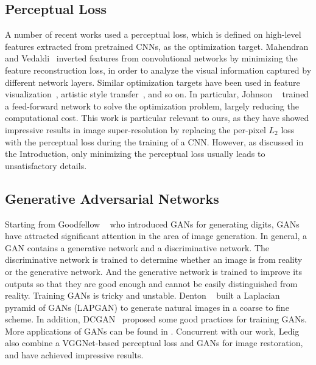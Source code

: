 \documentclass[10pt,twocolumn,letterpaper]{article}
\begin{document}
\subsection{Perceptual Loss}
A number of recent works used a perceptual loss, which is defined on high-level features extracted from pretrained CNNs, as the optimization target. Mahendran and Vedaldi~\cite{feature_inversion} inverted features from convolutional networks by minimizing the feature reconstruction loss, in order to analyze the visual information captured by different network layers. Similar optimization targets have been used in feature visualization~\cite{feature_visualization}, artistic style transfer~\cite{style_transfer,artistic_style}, and so on. In particular, Johnson \etal~\cite{perceptual_losses} trained a feed-forward network to solve the optimization problem, largely reducing the computational cost. This work is particular relevant to ours, as they have showed impressive results in image super-resolution by replacing the per-pixel $L_2$ loss with the perceptual loss during the training of a CNN. However, as discussed in the Introduction, only minimizing the perceptual loss usually leads to unsatisfactory details.

\subsection{Generative Adversarial Networks}
Starting from Goodfellow \etal~\cite{gan} who introduced GANs for generating digits, GANs have attracted significant attention in the area of image generation. In general, a GAN contains a generative network and a discriminative network. The discriminative network is trained to determine whether an image is from reality or the generative network. And the generative network is trained to improve its outputs so that they are good enough and cannot be easily distinguished from reality. Training GANs is tricky and unstable. Denton \etal~\cite{lapgan} built a Laplacian pyramid of GANs (LAPGAN) to generate natural images in a coarse to fine scheme. %
In addition, DCGAN~\cite{dcgan} proposed some good practices for training GANs. More applications of GANs can be found in \cite{deep_multi_scale,generating_images_with_recurrent,generative_image_modeling}. Concurrent with our work, Ledig \etal~\cite{srgan} also combine a VGGNet-based perceptual loss and GANs for image restoration, and have achieved impressive results.
\end{document}
